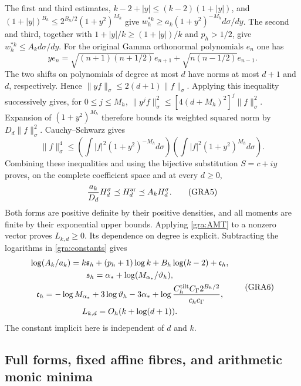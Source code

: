 \documentclass[11pt,a4paper]{article}
\begin{document}
The first and third estimates, $k-2+|y|\le(k-2)(1+|y|)$, and
$(1+|y|)^{B_h}\le2^{B_h/2}(1+y^2)^{M_h}$ give
$w_h^{*k}\ge a_k(1+y^2)^{-M_h}d\sigma/dy$.  The second and third,
together with $1+|y|/k\ge(1+|y|)/k$ and $p_h>1/2$, give
$w_h^{*k}\le A_kd\sigma/dy$.
For the original Gamma orthonormal polynomials $e_n$ one has
\[
 ye_n=\sqrt{(n+1)(n+1/2)}e_{n+1}
       +\sqrt{n(n-1/2)}e_{n-1}.
\]
The two shifts on polynomials of degree at most $d$ have norms at most
$d+1$ and $d$, respectively.  Hence
$\|yf\|_\sigma\le2(d+1)\|f\|_\sigma$.  Applying this inequality
successively gives, for $0\le j\le M_h$,
$\|y^jf\|_\sigma^2\le[4(d+M_h)^2]^j\|f\|_\sigma^2$.
Expansion of $(1+y^2)^{M_h}$ therefore bounds its weighted squared norm
by $D_d\|f\|_\sigma^2$.  Cauchy--Schwarz gives
\[
 \|f\|_\sigma^4\le
 \left(\int|f|^2(1+y^2)^{-M_h}d\sigma\right)
 \left(\int|f|^2(1+y^2)^{M_h}d\sigma\right).
\]
Combining these inequalities and using the bijective substitution
$S=c+iy$ proves, on the complete coefficient space and at every $d\ge0$,
\begin{equation}
 \frac{a_k}{D_d}H_d^\sigma\preceq H_d^{\rm ar}
 \preceq A_kH_d^\sigma.
 \tag{GRA5}\label{gra:AMT}
\end{equation}
Both forms are positive definite by their positive densities, and all
moments are finite by their exponential upper bounds.  Applying
\eqref{gra:AMT} to a nonzero vector proves $L_{k,d}\ge0$.
Its dependence on degree is explicit.  Subtracting the logarithms in
\eqref{gra:constants} gives
\begin{equation}
 \begin{gathered}
 \log(A_k/a_k)=k\mathfrak s_h+(p_h+1)\log k
             +B_h\log(k-2)+\mathfrak c_h,\\
 \mathfrak s_h=\alpha_*+\log(M_{\alpha_*}/\vartheta_h),\\
 \mathfrak c_h=-\log M_{\alpha_*}+3\log\vartheta_h-3\alpha_*
 +\log\frac{C_h^{\rm tilt}C_\Gamma2^{B_h/2}}{c_hc_\Gamma},\\
 L_{k,d}=O_h(k+\log(d+1)).
 \end{gathered}\tag{GRA6}\label{gra:Lgrowth}
\end{equation}
The constant implicit here is independent of $d$ and $k$.

\subsection{Full forms, fixed affine fibres, and arithmetic monic minima}
\end{document}
